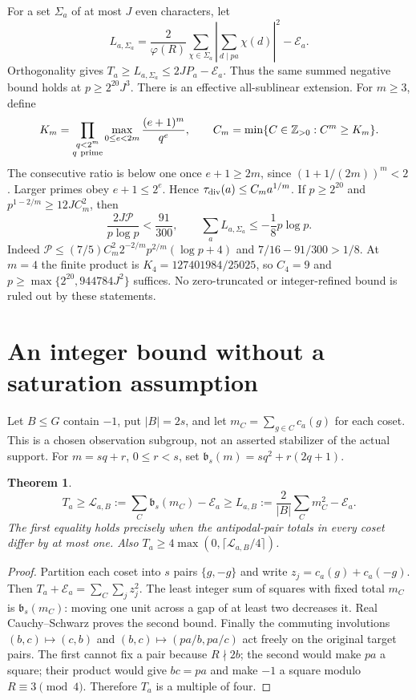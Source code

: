 \documentclass[10pt,reqno]{amsart}
\newtheorem{theorem}{Theorem}
\begin{document}
For a set $\Sigma_a$ of at most $J$ even characters, let
\[
 L_{a,\Sigma_a}=\frac2{\varphi(R)}\sum_{\chi\in\Sigma_a}
 \left|\sum_{d\mid pa}\chi(d)\right|^2-\mathcal E_a.
\]
Orthogonality gives $T_a\ge L_{a,\Sigma_a}\le2JP_a-\mathcal E_a$.
Thus the same summed negative bound holds at $p\ge2^{20}J^3$.
There is an effective all-sublinear extension. For $m\ge3$, define
\[
 K_m=\prod_{\substack{q<2^m\\q\ {\rm prime}}}
       \max_{0\le e<2m}\frac{(e+1)^m}{q^e},\qquad
 C_m=\min\{C\in\mathbb Z_{>0}:C^m\ge K_m\}.
\]
The consecutive ratio is below one once $e+1\ge2m$, since
$(1+1/(2m))^m<2$. Larger primes obey $e+1\le2^e$.
Hence $\tau_{\rm div}(a)\le C_ma^{1/m}$.
If $p\ge2^{20}$ and $p^{1-2/m}\ge12JC_m^2$, then
\[
 \frac{2J\mathcal P}{p\log p}<\frac{91}{300},\qquad
 \boxed{\sum_aL_{a,\Sigma_a}\le-\frac18p\log p.}
\]
Indeed $\mathcal P\le(7/5)C_m^2 2^{-2/m}p^{2/m}(\log p+4)$ and
$7/16-91/300>1/8$. At $m=4$ the finite product is
$K_4=127401984/25025$, so $C_4=9$ and
$p\ge\max\{2^{20},944784J^2\}$ suffices.
No zero-truncated or integer-refined bound is ruled out by these statements.

\section{An integer bound without a saturation assumption}
Let $B\le G$ contain $-1$, put $|B|=2s$, and let
$m_C=\sum_{g\in C}c_a(g)$ for each coset. This is a chosen observation
subgroup, not an asserted stabilizer of the actual support. For $m=sq+r$,
$0\le r<s$, set $\mathfrak b_s(m)=sq^2+r(2q+1)$.

\begin{theorem}\label{thm:int}
\[
 T_a\ge\mathcal L_{a,B}:=\sum_C\mathfrak b_s(m_C)-\mathcal E_a
 \ge L_{a,B}:=\frac2{|B|}\sum_Cm_C^2-\mathcal E_a.
\]
The first equality holds precisely when the antipodal-pair totals in every
coset differ by at most one. Also
$T_a\ge4\max(0,\lceil\mathcal L_{a,B}/4\rceil)$.
\end{theorem}
\begin{proof}
Partition each coset into $s$ pairs $\{g,-g\}$ and write $z_j=c_a(g)+c_a(-g)$.
Then $T_a+\mathcal E_a=\sum_C\sum_jz_j^2$. The least integer sum of squares
with fixed total $m_C$ is $\mathfrak b_s(m_C)$: moving one unit across a gap
of at least two decreases it. Real Cauchy--Schwarz proves the second bound.
Finally the commuting involutions $(b,c)\mapsto(c,b)$ and
$(b,c)\mapsto(pa/b,pa/c)$ act freely on the original target pairs.
The first cannot fix a pair because $R\nmid2b$; the second would make $pa$
a square; their product would give $bc=pa$ and make $-1$ a square modulo
$R\equiv3\pmod4$. Therefore $T_a$ is a multiple of four.
\end{proof}
\end{document}
